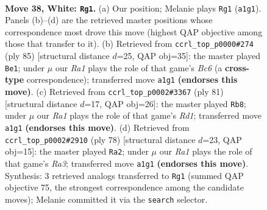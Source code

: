 \documentclass[11pt]{article}
\begin{document}
\clearpage

\begin{figure}[p]\centering
\begin{subfigure}{0.46\textwidth}\centering
\resizebox{\linewidth}{!}{%
\newchessgame
\chessboard[
  setfen={6r1/3bk3/1p6/p3p3/P3N3/1P3KP1/8/R7 w - - 6 38},
  showmover=false,
  pgfstyle=straightmove, color=movearrow, markmove={a1-g1}
]}
\caption{}
\end{subfigure}\hfill
\begin{subfigure}{0.46\textwidth}\centering
\resizebox{\linewidth}{!}{%
\newchessgame
\chessboard[
  setfen={8/4nk2/1R2p1p1/3p4/6PP/p1b5/B5K1/8 b - - 2 43},
  showmover=false,
  pgfstyle=straightmove, color=movearrow, markmove={c3-e1}
]}
\caption{}
\end{subfigure}
\\[4pt]
\begin{subfigure}{0.46\textwidth}\centering
\resizebox{\linewidth}{!}{%
\newchessgame
\chessboard[
  setfen={3r4/R4p2/3n1kp1/3P4/4pP2/8/1P3PBK/8 b - - 2 41},
  showmover=false,
  pgfstyle=straightmove, color=movearrow, markmove={d8-b8}
]}
\caption{}
\end{subfigure}\hfill
\begin{subfigure}{0.46\textwidth}\centering
\resizebox{\linewidth}{!}{%
\newchessgame
\chessboard[
  setfen={2r2k2/5p2/4p2p/7N/6Pb/R6P/5PK1/8 w - - 7 40},
  showmover=false,
  pgfstyle=straightmove, color=movearrow, markmove={a3-a2}
]}
\caption{}
\end{subfigure}
\caption{\textbf{Move 38, White: \texttt{Rg1}.} (a) Our position; Melanie plays \texttt{Rg1} (\texttt{a1g1}). Panels (b)--(d) are the retrieved master positions whose correspondence most drove this move (highest QAP objective among those that transfer to it). (b) Retrieved from \texttt{ccrl\_top\_p0000\#274} (ply 85) [structural distance $d$=25, QAP obj=35]: the master played \texttt{Be1}; under $\mu$ our \emph{Ra1} plays the role of that game's \emph{Bc6} (a \textbf{cross-type} correspondence); transferred move \texttt{a1g1} \textbf{(endorses this move)}. (c) Retrieved from \texttt{ccrl\_top\_p0002\#3367} (ply 81) [structural distance $d$=17, QAP obj=26]: the master played \texttt{Rb8}; under $\mu$ our \emph{Ra1} plays the role of that game's \emph{Rd1}; transferred move \texttt{a1g1} \textbf{(endorses this move)}. (d) Retrieved from \texttt{ccrl\_top\_p0002\#2910} (ply 78) [structural distance $d$=23, QAP obj=15]: the master played \texttt{Ra2}; under $\mu$ our \emph{Ra1} plays the role of that game's \emph{Ra3}; transferred move \texttt{a1g1} \textbf{(endorses this move)}. Synthesis: 3 retrieved analogs transferred to \texttt{Rg1} (summed QAP objective 75, the strongest correspondence among the candidate moves); Melanie committed it via the \texttt{search} selector.}
\label{fig:thought-m74}
\end{figure}
\end{document}
